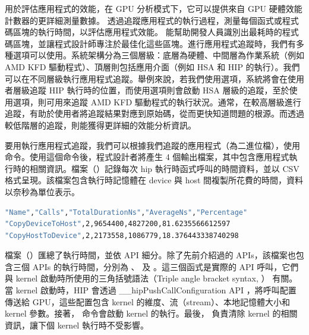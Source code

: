  用於評估應用程式的效能，在 GPU 分析模式下，它可以提供來自 GPU 硬體效能計數器的更詳細測量數據。 透過追蹤應用程式的執行過程，測量每個函式或程式碼區塊的執行時間，以評估應用程式效能。 能幫助開發人員識別出最耗時的程式碼區塊，並讓程式設計師專注於最佳化這些區塊。進行應用程式追蹤時，我們有多種選項可以使用。系統架構分為三個層級：底層為硬體、中間層為作業系統（例如 AMD KFD 驅動程式）、頂層則包括應用介面（例如 HSA 和 HIP 的執行）。我們可以在不同層級執行應用程式追蹤。舉例來說，若我們使用選項，系統將會在使用者層級追蹤 HIP 執行時的位置，而使用選項則會啟動 HSA 層級的追蹤，至於使用選項，則可用來追蹤 AMD KFD 驅動程式的執行狀況。通常，在較高層級進行追蹤，有助於使用者將追蹤結果對應到原始碼，從而更快知道問題的根源。而透過較低階層的追蹤，則能獲得更詳細的效能分析資訊。

要用執行應用程式追蹤，我們可以根據我們追蹤的應用程式（為二進位檔），使用命令。使用這個命令後，程式設計者將產生 4 個輸出檔案，其中包含應用程式執行時的相關資訊。檔案（）記錄每次 hip 執行時函式呼叫的時間資料，並以 CSV 格式呈現。該檔案包含執行時記憶體在 device 與 host 間複製所花費的時間，資料以奈秒為單位表示。

\begin{lstlisting}[language=bash, caption={\term{results.copy\_stats.csv} 在應用程式追蹤模式下的輸出結果}, label={lst:results.copy_stats.csv output}]
"Name","Calls","TotalDurationNs","AverageNs","Percentage"
"CopyDeviceToHost",2,9654400,4827200,81.6235566612597
"CopyHostToDevice",2,2173558,1086779,18.376443338740298
\end{lstlisting}

檔案（）匯總了執行時間，並依 API 細分。除了先前介紹過的 APIs，該檔案也包含三個 APIs 的執行時間，分別為 、 及 。這三個函式是實際的 API 呼叫，它們與 kernel 啟動時所使用的三角括號語法（Triple angle bracket syntax, \code{<<< >>>}） 有關。當 kernel 啟動時，HIP 會透過 \_\_hipPushCallConfiguration API ，將呼叫配置傳送給 GPU，這些配置包含 kernel 的維度、流（stream）、本地記憶體大小和 kernel 參數。接著， 命令會啟動 kernel 的執行。最後， 負責清除 kernel 的相關資訊，讓下個 kernel 執行時不受影響。

